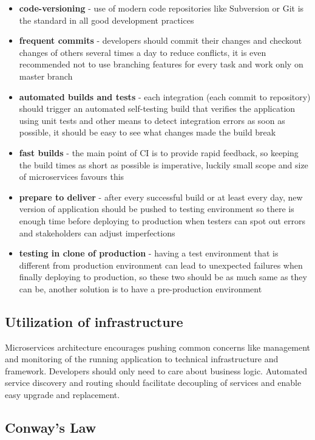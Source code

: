 \documentclass[12pt,oneside]{fithesis2}
\begin{document}
\begin{itemize}
\item \textbf{code-versioning} - use of modern code repositories like Subversion or Git is the standard in all good development practices
\item \textbf{frequent commits} - developers should commit their changes and checkout changes of others several times a day to reduce conflicts, it is even recommended not to use branching features for every task and work only on master branch
\item \textbf{automated builds and tests} - each integration (each commit to repository) should trigger an automated self-testing build that verifies the application using unit tests and other means to detect integration errors as soon as possible, it should be easy to see what changes made the build break
\item \textbf{fast builds} - the main point of CI is to provide rapid feedback, so keeping the build times as short as possible is imperative, luckily small scope and size of microservices favours this
\item \textbf{prepare to deliver} - after every successful build or at least every day, new version of application should be pushed to testing environment so there is enough time before deploying to production when testers can spot out errors and stakeholders can adjust imperfections
\item \textbf{testing in clone of production} - having a test environment that is different from production environment can lead to unexpected failures when finally deploying to production, so these two should be as much same as they can be, another solution is to have a pre-production environment
\end{itemize}

\subsection{Utilization of infrastructure}

Microservices architecture encourages pushing common concerns like management and monitoring of the running application to technical infrastructure and framework. Developers should only need to care about business logic.
Automated service discovery and routing should facilitate decoupling of services and enable easy upgrade and replacement.

\subsection{Conway's Law}
\end{document}

